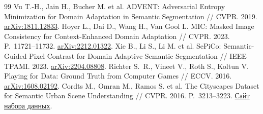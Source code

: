 \begin{thebibliography}{99}
 Vu T.-H., Jain H., Bucher M. et al. ADVENT: Adversarial Entropy Minimization for Domain Adaptation in Semantic Segmentation // CVPR. 2019. \href{https://arxiv.org/abs/1811.12833}{arXiv:1811.12833}.
 Hoyer L., Dai D., Wang H., Van Gool L. MIC: Masked Image Consistency for Context-Enhanced Domain Adaptation // CVPR. 2023. P.~11721--11732. \href{https://arxiv.org/abs/2212.01322}{arXiv:2212.01322}.
 Xie B., Li S., Li M. et al. SePiCo: Semantic-Guided Pixel Contrast for Domain Adaptive Semantic Segmentation // IEEE TPAMI. 2023. \href{https://arxiv.org/abs/2204.08808}{arXiv:2204.08808}.
 Richter S.~R., Vineet V., Roth S., Koltun V. Playing for Data: Ground Truth from Computer Games // ECCV. 2016. \href{https://arxiv.org/abs/1608.02192}{arXiv:1608.02192}.
 Cordts M., Omran M., Ramos S. et al. The Cityscapes Dataset for Semantic Urban Scene Understanding // CVPR. 2016. P.~3213--3223. \href{https://www.cityscapes-dataset.com/}{Сайт набора данных}.
\end{thebibliography}
